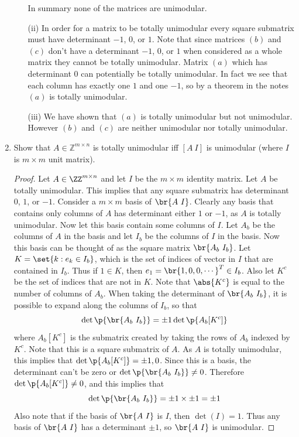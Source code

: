 \documentclass[11pt, oneside]{article}
\begin{document}
\begin{enumerate}
\begin{enumerate}
        In summary none of the matrices are unimodular.

      \item[(ii)]
        In order for a matrix to be totally unimodular every square submatrix
        must have determinant $-1$, $0$, or $1$.
        Note that since matrices $(b)$ and $(c)$ don't have a determinant
        $-1$, $0$, or $1$ when considered as a whole matrix they cannot be
        totally unimodular.
        Matrix $(a)$ which has determinant 0 can potentially be totally
        unimodular.
        In fact we see that each column has exactly one $1$ and one $-1$, so
        by a theorem in the notes $(a)$ is totally unimodular.

      \item[(iii)]
        We have shown that $(a)$ is totally unimodular but not unimodular.
        However $(b)$ and $(c)$ are neither unimodular nor totally unimodular.
    \end{enumerate}

  \item %
    Show that $A \in \mathbb{Z}^{m \times n}$ is totally unimodular iff $[A\ I]$
    is unimodular (where $I$ is $m \times m$ unit matrix).

    \begin{proof}
      Let $A \in \ZZ^{m \times n}$ and let $I$ be the $m \times m$ identity
      matrix.
      Let $A$ be totally unimodular.
      This implies that any square submatrix has determinant $0$, $1$, or $-1$.
      Consider a $m \times m$ basis of $\br{A\ I}$.
      Clearly any basis that contains only columns of $A$ has determinant either
      $1$ or $-1$, as $A$ is totally unimodular.
      Now let this basis contain some columns of $I$.
      Let $A_b$ be the columns of $A$ in the basis and let $I_b$ be the
      columns of $I$ in the basis.
      Now this basis can be thought of as the square matrix $\br{A_b\ I_b}$.
      Let $K = \set{k : e_k \in I_b}$, which is the set of indices of vector
      in $I$ that are contained in $I_b$.
      Thus if $1 \in K$, then $e_1 = \br{1, 0, 0, \cdots}^T \in I_b$.
      Also let $K^c$ be the set of indices that are not in $K$.
      Note that $\abs{K^c}$ is equal to the number of columns of $A_b$.
      When taking the determinant of $\br{A_b\ I_b}$, it is possible to
      expand along the columns of $I_b$, so that
      \[
        \det\p{\br{A_b\ I_b}} = \pm 1 \det\p{A_b[K^c]}
      \]
      where $A_b[K^c]$ is the submatrix created by taking the rows of $A_b$
      indexed by $K^c$.
      Note that this is a square submatrix of $A$. 
      As $A$ is totally unimodular, this implies that $\det\p{A_b[K^c]} = \pm1, 0$.
      Since this is a basis, the determinant can't be zero or
      $\det\p{\br{A_b\ I_b}} \neq 0$.
      Therefore $\det\p{A_b[K^c]} \neq 0$, and this implies that
      \[
        \det\p{\br{A_b\ I_b}} = \pm 1 \times \pm 1 = \pm 1
      \]
      Also note that if the basis of $\br{A\ I}$ is $I$, then $\det(I) = 1$.
      Thus any basis of $\br{A\ I}$ has a determinant $\pm 1$, so $\br{A\ I}$ is
      unimodular.


\end{proof}
\end{enumerate}
\end{document}
